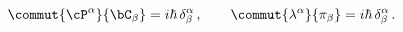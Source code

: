 \begin{equation}
  \commut{\cP^\alpha}{\bC_\beta}=i\hbar\, \delta^\alpha_\beta\,, \qquad
  \commut{\lambda^\alpha}{\pi_\beta}=i\hbar\, \delta^\alpha_\beta\,.
\end{equation}

